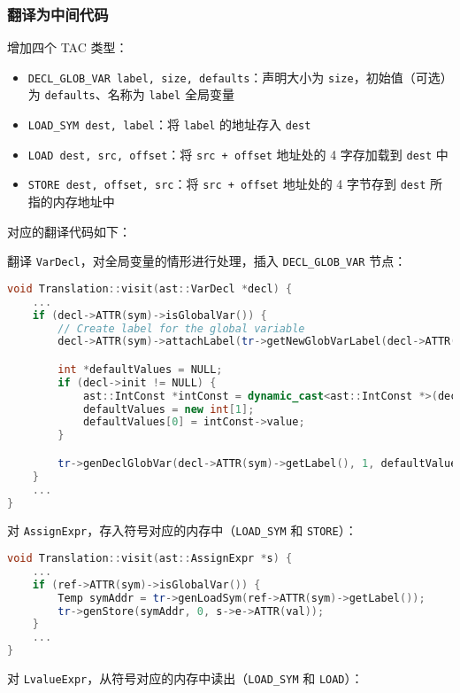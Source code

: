 \documentclass[a4paper]{article}
\begin{document}
\subsubsection{翻译为中间代码}

增加四个 TAC 类型：

\begin{itemize}
    \item \texttt{DECL\_GLOB\_VAR label, size, defaults}：声明大小为 \texttt{size}，初始值（可选）为 \texttt{defaults}、名称为 \texttt{label} 全局变量
    \item \texttt{LOAD\_SYM dest, label}：将 \texttt{label} 的地址存入 \texttt{dest}
    \item \texttt{LOAD dest, src, offset}：将 \texttt{src + offset} 地址处的 4 字存加载到 \texttt{dest} 中
    \item \texttt{STORE dest, offset, src}：将 \texttt{src + offset} 地址处的 4 字节存到 \texttt{dest} 所指的内存地址中
\end{itemize}

对应的翻译代码如下：

翻译 \texttt{VarDecl}，对全局变量的情形进行处理，插入 \texttt{DECL\_GLOB\_VAR} 节点：

\begin{lstlisting}[language=c++]
void Translation::visit(ast::VarDecl *decl) {
    ...
    if (decl->ATTR(sym)->isGlobalVar()) {
        // Create label for the global variable
        decl->ATTR(sym)->attachLabel(tr->getNewGlobVarLabel(decl->ATTR(sym)));

        int *defaultValues = NULL;
        if (decl->init != NULL) {
            ast::IntConst *intConst = dynamic_cast<ast::IntConst *>(decl->init);
            defaultValues = new int[1];
            defaultValues[0] = intConst->value;
        }

        tr->genDeclGlobVar(decl->ATTR(sym)->getLabel(), 1, defaultValues);
    }
    ...
}
\end{lstlisting}

对 \texttt{AssignExpr}，存入符号对应的内存中（\texttt{LOAD\_SYM} 和 \texttt{STORE}）：

\begin{lstlisting}[language=c++]
void Translation::visit(ast::AssignExpr *s) {
    ...
    if (ref->ATTR(sym)->isGlobalVar()) {
        Temp symAddr = tr->genLoadSym(ref->ATTR(sym)->getLabel());
        tr->genStore(symAddr, 0, s->e->ATTR(val));
    }
    ...
}
\end{lstlisting}

对 \texttt{LvalueExpr}，从符号对应的内存中读出（\texttt{LOAD\_SYM} 和 \texttt{LOAD}）：
\end{document}
